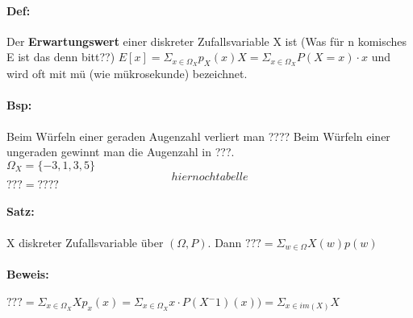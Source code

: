 \documentclass{article}
\begin{document}
\paragraph*{Def:} Der \textbf{Erwartungswert} einer diskreter Zufallsvariable X ist (Was für n komisches E ist das denn bitt??) \(E[x] = \Sigma_{x \in \Omega_X} p_X (x) X = \Sigma_{x \in \Omega_X} P(X=x)\cdot x\) und wird oft mit mü (wie mükrosekunde) bezeichnet.

\paragraph*{Bsp:} Beim Würfeln einer geraden Augenzahl verliert man ???? Beim Würfeln einer ungeraden gewinnt man die Augenzahl in ???. \\ \(\Omega_X = \{-3,1,3,5\}\) \[hier noch tabelle\] \(??? = ????\)

\paragraph*{Satz:} X diskreter Zufallsvariable über \((\Omega, P)\). Dann \(??? = \Sigma_{w \in \Omega}X(w) p(w)\)

\paragraph*{Beweis:} \(??? = \Sigma_{x \in \Omega_X} Xp_x(x) = \Sigma_{x \in \Omega_X} x \cdot P(X^-1)(x)) = \Sigma_{x \in im(X)} X \)
\end{document}
